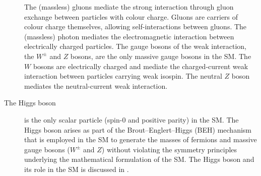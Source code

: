 \begin{description}
  The (massless) gluons mediate the strong interaction through gluon exchange
  between particles with colour charge. Gluons are carriers of colour charge
  themselves, allowing self-interactions between gluons. The (massless) photon
  mediates the electromagnetic interaction between electrically charged
  particles. The gauge bosons of the weak interaction, the $W^\pm$ and $Z$
  bosons, are the only massive gauge bosons in the SM. The $W$ bosons are
  electrically charged and mediate the charged-current weak interaction between
  particles carrying weak isospin. The neutral $Z$ boson mediates the
  neutral-current weak interaction.

\item[The Higgs boson] is the only scalar particle (spin-$0$ and positive
  parity) in the SM. The Higgs boson arises as part of the Brout--Englert--Higgs
  (BEH) mechanism~\cite{Englert:1964et,Higgs:1964pj} that is employed in the SM
  to generate the masses of fermions and massive gauge bosons ($W^\pm$ and $Z$)
  without violating the symmetry principles underlying the mathematical
  formulation of the SM. The Higgs boson and its role in the SM is discussed in
  .

\end{description}

